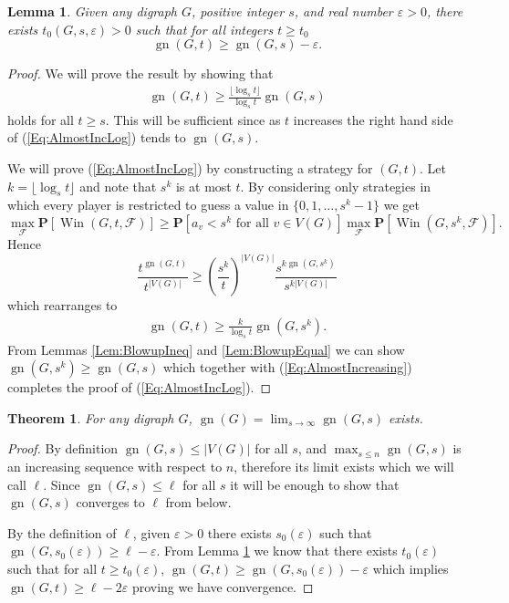 \documentclass[a4paper, 14pt]{extarticle}
\theoremstyle{plain}
\newtheorem{theorem}[proposition]{Theorem}
\newtheorem{lemma}[proposition]{Lemma}
\def\mc{\mathcal}
\def\mb{\mathbf}
\DeclareMathOperator{\gn}{gn}
\DeclareMathOperator{\Win}{Win}
\begin{document}
\begin{lemma}\label{Lem:Monotonic}
Given any digraph $G$, positive integer $s$, and real number
$\varepsilon>0$, there exists $t_0(G, s,\varepsilon)>0$ such that for all
integers $t\geq t_0$
\[
\gn(G,t)\geq \gn(G,s)-\varepsilon.
\]
\end{lemma}

\begin{proof}
We will prove the result by showing that
\begin{align}\label{Eq:AlmostIncLog}
\gn(G,t)\geq\frac{\lfloor \log_st\rfloor}{\log_st}\gn(G,s)
\end{align}
holds for all $t\geq s$. This will be sufficient since as $t$
increases the right hand side of (\ref{Eq:AlmostIncLog}) tends to
$\gn(G,s)$.

We will prove (\ref{Eq:AlmostIncLog}) by constructing a strategy for
$(G,t)$. Let $k=\lfloor \log_st\rfloor$ and note that $s^k$ is at
most $t$. By considering only strategies in which every player is
restricted to guess a value in $\{0,1,\ldots,s^k-1\}$ we get
\[
\max_{\mc{F}}\mb{P}[\Win(G,t,\mc{F})] \geq \mb{P}[a_v<s^k \mbox{ for
all } v\in V(G)]\max_{\mc{F}}\mb{P}[\Win(G,s^k,\mc{F})].
\]
Hence
\[
\frac{t^{\gn(G,t)}}{t^{|V(G)|}}\geq
\left(\frac{s^k}{t}\right)^{|V(G)|}
\frac{s^{k\gn(G,s^k)}}{s^{k|V(G)|}}
\]
which rearranges to
\begin{align}\label{Eq:AlmostIncreasing}
\gn(G,t)\geq\frac{k}{\log_st}\gn(G,s^k).
\end{align}
From Lemmas \ref{Lem:BlowupIneq} and \ref{Lem:BlowupEqual} we can
show $\gn(G,s^k)\geq\gn(G,s)$ which together with
(\ref{Eq:AlmostIncreasing}) completes the proof of
(\ref{Eq:AlmostIncLog}).
\end{proof}

\begin{theorem}
For any digraph $G$, $\displaystyle{\gn(G) = \lim_{s\to\infty} \gn(G,s)}$ exists.
\end{theorem}

\begin{proof}
By definition $\gn(G,s)\leq |V(G)|$ for all $s$, and $\max_{s\leq
n}\gn(G,s)$ is an increasing sequence with respect to $n$, therefore
its limit exists which we will call $\ell$. Since $\gn(G,s)\leq \ell$ for
all $s$ it will be enough to show that $\gn(G,s)$ converges to $\ell$
from below.

By the definition of $\ell$, given $\varepsilon>0$ there exists
$s_0(\varepsilon)$ such that $\gn(G,s_0(\varepsilon))\geq \ell-\varepsilon$.
From Lemma \ref{Lem:Monotonic} we know that there exists
$t_0(\varepsilon)$ such that for all $t\geq t_0(\varepsilon)$,
$\gn(G,t)\geq \gn(G,s_0(\varepsilon))-\varepsilon$ which implies
$\gn(G,t)\geq \ell-2\varepsilon$ proving we have convergence.
\end{proof}
\end{document}
